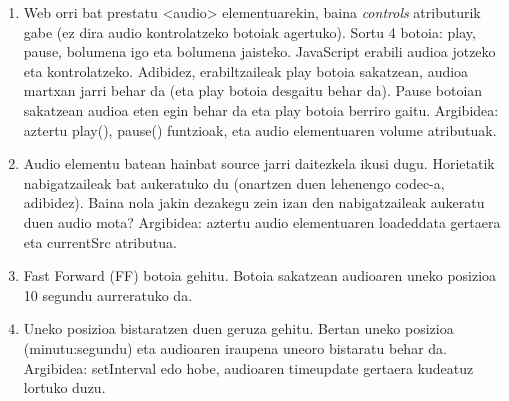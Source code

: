 \begin{enumerate}
\item Web orri bat prestatu <audio> elementuarekin, baina \textit{controls} atributurik gabe (ez dira audio kontrolatzeko botoiak agertuko). Sortu 4 botoia: play, pause, bolumena igo eta bolumena jaisteko.
JavaScript erabili audioa jotzeko eta kontrolatzeko. Adibidez, erabiltzaileak play botoia sakatzean, audioa martxan jarri behar da (eta play botoia desgaitu behar da). Pause botoian sakatzean audioa eten egin behar da eta play botoia berriro gaitu. Argibidea: aztertu play(), pause() funtzioak, eta audio elementuaren volume atributuak.

\item Audio elementu batean hainbat source jarri daitezkela ikusi dugu. Horietatik nabigatzaileak bat aukeratuko du (onartzen duen lehenengo codec-a, adibidez). Baina nola jakin dezakegu zein izan den nabigatzaileak aukeratu duen audio mota? Argibidea: aztertu audio elementuaren loadeddata gertaera eta currentSrc atributua.

\item Fast Forward (FF) botoia gehitu. Botoia sakatzean audioaren uneko posizioa 10 segundu aurreratuko da.

\item Uneko posizioa bistaratzen duen geruza gehitu. Bertan uneko posizioa (minutu:segundu) eta audioaren iraupena uneoro bistaratu behar da. Argibidea: setInterval edo hobe, audioaren timeupdate gertaera kudeatuz lortuko duzu.

\end{enumerate}
